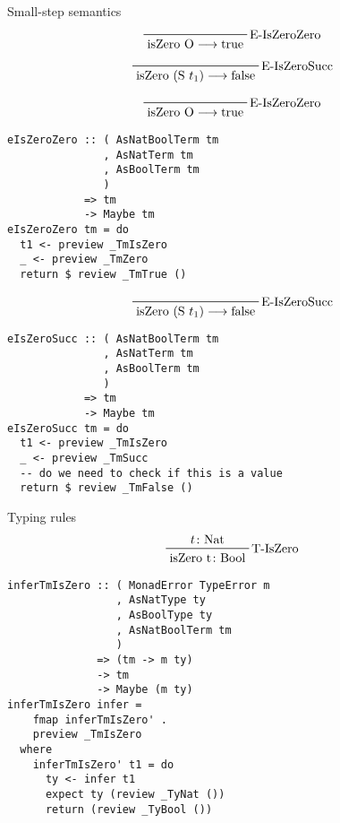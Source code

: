 \documentclass{beamer}
\begin{document}
\begin{frame}[c]
  Small-step semantics
  \begin{displaymath}  
    \prftree[r]{E-IsZeroZero}
    {\text{isZero O} \longrightarrow \text{true}}
  \end{displaymath}  
  \begin{displaymath}  
    \prftree[r]{E-IsZeroSucc}
    {\text{isZero (S $t_1$)} \longrightarrow \text{false}}
  \end{displaymath}  
\end{frame}

\begin{frame}[fragile]
  \begin{displaymath}  
    \prftree[r]{E-IsZeroZero}
    {\text{isZero O} \longrightarrow \text{true}}
  \end{displaymath}  
\begin{verbatim}
eIsZeroZero :: ( AsNatBoolTerm tm
               , AsNatTerm tm
               , AsBoolTerm tm
               )
            => tm 
            -> Maybe tm
eIsZeroZero tm = do
  t1 <- preview _TmIsZero
  _ <- preview _TmZero
  return $ review _TmTrue ()
\end{verbatim}
\end{frame}

\begin{frame}[fragile]
  \begin{displaymath}  
    \prftree[r]{E-IsZeroSucc}
    {\text{isZero (S $t_1$)} \longrightarrow \text{false}}
  \end{displaymath}  
\begin{verbatim}
eIsZeroSucc :: ( AsNatBoolTerm tm
               , AsNatTerm tm
               , AsBoolTerm tm
               )
            => tm 
            -> Maybe tm
eIsZeroSucc tm = do
  t1 <- preview _TmIsZero
  _ <- preview _TmSucc
  -- do we need to check if this is a value
  return $ review _TmFalse ()
\end{verbatim}
\end{frame}

\begin{frame}
  Typing rules
  \begin{displaymath}  
    \prftree[r]{T-IsZero}
    {t \colon \text{Nat}}
    {\text{isZero t} \colon \text{Bool}}
  \end{displaymath}  
\end{frame}

\begin{frame}[fragile]
  \begin{verbatim}
inferTmIsZero :: ( MonadError TypeError m
                 , AsNatType ty
                 , AsBoolType ty
                 , AsNatBoolTerm tm
                 )
              => (tm -> m ty)
              -> tm
              -> Maybe (m ty)
inferTmIsZero infer =
    fmap inferTmIsZero' . 
    preview _TmIsZero
  where
    inferTmIsZero' t1 = do
      ty <- infer t1
      expect ty (review _TyNat ())
      return (review _TyBool ())
  \end{verbatim}
\end{frame} 
\end{document}
